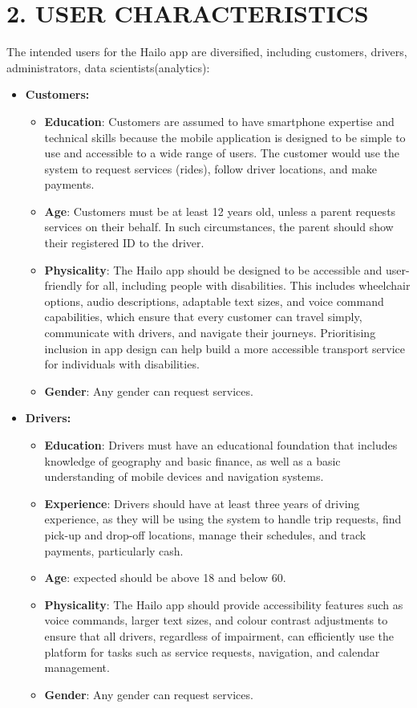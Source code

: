 \documentclass[9pt]{report}
\begin{document}
\section*{2. USER CHARACTERISTICS}
The intended users for the Hailo app are diversified, including customers, drivers, administrators, data scientists(analytics):
\begin{itemize}
\item \textbf{Customers:}
    \begin{itemize}
        \item \textbf{Education}: Customers are assumed to have smartphone expertise and technical skills because the mobile application is designed to be simple to use and accessible to a wide range of users. The customer would use the system to request services (rides), follow driver locations, and make payments.
        \item \textbf{Age}: Customers must be at least 12 years old, unless a parent requests services on their behalf. In such circumstances, the parent should show their registered ID to the driver.
        \item \textbf{Physicality}: The Hailo app should be designed to be accessible and user-friendly for all, including people with disabilities. This includes wheelchair options, audio descriptions, adaptable text sizes, and voice command capabilities, which ensure that every customer can travel simply, communicate with drivers, and navigate their journeys. Prioritising inclusion in app design can help build a more accessible transport service for individuals with disabilities.
        \item \textbf{Gender}: Any gender can request services.
    \end{itemize}

\item \textbf{Drivers:}
    \begin{itemize}
        \item \textbf{Education}: Drivers must have an educational foundation that includes knowledge of geography and basic finance, as well as a basic understanding of mobile devices and navigation systems.
        \item \textbf{Experience}: Drivers should have at least three years of driving experience, as they will be using the system to handle trip requests, find pick-up and drop-off locations, manage their schedules, and track payments, particularly cash.
        \item \textbf{Age}: expected should be above 18 and below 60. 
        \item \textbf{Physicality}: The Hailo app should provide accessibility features such as voice commands, larger text sizes, and colour contrast adjustments to ensure that all drivers, regardless of impairment, can efficiently use the platform for tasks such as service requests, navigation, and calendar management.
        \item \textbf{Gender}: Any gender can request services.
    \end{itemize}


\end{itemize}
\end{document}
